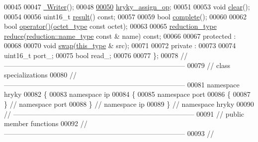 \begin{DoxyCode}
00045 
00047     \hyperlink{classhryky_1_1ip_1_1port_1_1_writer_a68b7119adad6bceafe5316387553a650}{~Writer}();
00048 
\hypertarget{ip__port__writer_8h_source_l00050}{}\hyperlink{classhryky_1_1ip_1_1port_1_1_writer_a62323eb1ac80a36284b67c8c0abd19d2}{00050}     \hyperlink{classhryky_1_1ip_1_1port_1_1_writer_a62323eb1ac80a36284b67c8c0abd19d2}{hryky_assign_op};
00051 
00053     \textcolor{keywordtype}{void} \hyperlink{classhryky_1_1ip_1_1port_1_1_writer_a49484f2c4963f8ea32ccacfef26a640a}{clear}();
00054 
00056     uint16\_t \hyperlink{classhryky_1_1ip_1_1port_1_1_writer_ae78795d520d2869318459f131f293f76}{result}() \textcolor{keyword}{const};
00057 
00059     \textcolor{keywordtype}{bool} \hyperlink{classhryky_1_1ip_1_1port_1_1_writer_ad376f9522356a8e10ea63d31c37c6aeb}{complete}();
00060 
00062     \textcolor{keywordtype}{bool} \hyperlink{classhryky_1_1ip_1_1port_1_1_writer_ae6005e2bb1ee6df756a3f3f5c3ec6e0e}{operator()}(\hyperlink{namespacehryky_a488cba8b666be33ccca70e819684e3c8}{octet_type} \textcolor{keyword}{const} octet);
00063 
00065     \hyperlink{classhryky_1_1_intrusive_ptr}{reduction_type} \hyperlink{classhryky_1_1ip_1_1port_1_1_writer_ab4757e3dc1477c201a2e412b679cf2eb}{reduce}(\hyperlink{classhryky_1_1reduction_1_1_string}{reduction::name_type} \textcolor{keyword}{const} & name) \textcolor{keyword}{const};
00066 
00067 \textcolor{keyword}{protected} :
00068 
00070     \textcolor{keywordtype}{void} \hyperlink{classhryky_1_1ip_1_1port_1_1_writer_ad456c9b809d1f4be2a502f1276261d77}{swap}(\hyperlink{classhryky_1_1ip_1_1port_1_1_writer}{this_type} & src);
00071 
00072 \textcolor{keyword}{private} :
00073 
00074     uint16\_t    port\_;
00075     \textcolor{keywordtype}{bool}        read\_;
00076 
00077 \};
00078 \textcolor{comment}{//
      ------------------------------------------------------------------------------}
00079 \textcolor{comment}{// class specializations}
00080 \textcolor{comment}{//
      ------------------------------------------------------------------------------}
00081 \textcolor{keyword}{namespace }hryky
00082 \{
00083 \textcolor{keyword}{namespace }ip
00084 \{
00085 \textcolor{keyword}{namespace }port
00086 \{
00087 \} \textcolor{comment}{// namespace port}
00088 \} \textcolor{comment}{// namespace ip}
00089 \} \textcolor{comment}{// namespace hryky}
00090 \textcolor{comment}{//
      ------------------------------------------------------------------------------}
00091 \textcolor{comment}{// public member functions}
00092 \textcolor{comment}{//
      ------------------------------------------------------------------------------}
00093 \textcolor{comment}{//
}
\end{DoxyCode}
